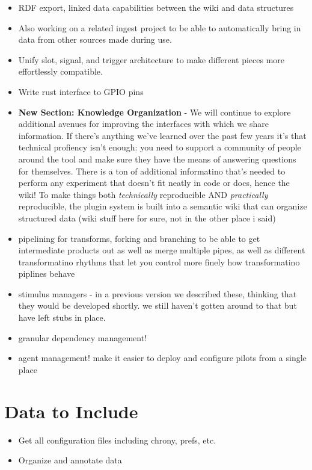 \begin{itemize}
\item RDF export, linked data capabilities between the wiki and data structures
\item Also working on a related ingest project to be able to automatically bring in data from other sources made during use. 
\item Unify slot, signal, and trigger architecture to make different pieces more effortlessly compatible.
\item Write rust interface to GPIO pins
\item \textbf{New Section: Knowledge Organization} - We will continue to explore additional avenues for improving the interfaces with which we share information. If there's anything we've learned over the past few years it's that technical profiency isn't enough: you need to support a community of people around the tool and make sure they have the means of answering questions for themselves. There is a ton of additional informatino that's needed to perform any experiment that doesn't fit neatly in code or docs, hence the wiki! To make things both \textit{technically} reproducible AND \textit{practically} reproducible, the plugin system is built into a semantic wiki that can organize structured data (wiki stuff here for sure, not in the other place i said)
\item pipelining for transforms, forking and branching to be able to get intermediate products out as well as merge multiple pipes, as well as different transformatino rhythms that let you control more finely how transformatino piplines behave
\item stimulus managers - in a previous version we described these, thinking that they would be developed shortly. we still haven't gotten around to that but have left stubs in place.
\item granular dependency management!
\item agent management! make it easier to deploy and configure pilots from a single place
\end{itemize}

\section{Data to Include}

\begin{itemize}
\item Get all configuration files including chrony, prefs, etc.
\item Organize and annotate data
\end{itemize}




